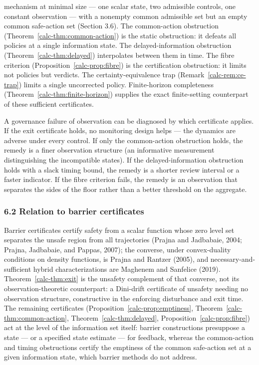 \documentclass[10pt,twocolumn]{article}
\theoremstyle{definition}
\begin{document}
mechanism at minimal size --- one scalar state, two admissible controls,
one constant observation --- with a nonempty common admissible set but an empty common safe-action set (Section 3.6). The common-action obstruction (Theorem~\ref{calc-thm:common-action}) is the static
obstruction: it defeats all policies at a single information state. The
delayed-information obstruction (Theorem~\ref{calc-thm:delayed}) interpolates between them in
time. The fibre criterion (Proposition~\ref{calc-prop:fibre}) is the certification obstruction:
it limits not policies but verdicts. The certainty-equivalence trap
(Remark~\ref{calc-rem:ce-trap}) limits a single uncorrected policy. Finite-horizon completeness
(Theorem~\ref{calc-thm:finite-horizon}) supplies the exact finite-setting
counterpart of these sufficient certificates.

A governance failure of observation can be diagnosed by which
certificate applies. If the exit certificate holds, no monitoring design
helps --- the dynamics are adverse under every control. If only the
common-action obstruction holds, the remedy is a finer observation
structure (an informative measurement distinguishing the incompatible
states). If the delayed-information obstruction holds with a slack
timing bound, the remedy is a shorter review interval or a faster
indicator. If the fibre criterion fails, the remedy is an observation
that separates the sides of the floor rather than a better threshold on
the aggregate.

\subsubsection{6.2 Relation to barrier
certificates}\label{calc-relation-to-barrier-certificates}

Barrier certificates certify safety from a scalar function whose zero level set separates the unsafe region from all trajectories (Prajna and Jadbabaie, 2004; Prajna, Jadbabaie, and Pappas, 2007); the converse, under convex-duality conditions on density functions, is Prajna and Rantzer (2005), and necessary-and-sufficient hybrid characterizations are Maghenem and Sanfelice (2019). Theorem~\ref{calc-thm:exit} is the unsafety complement of that converse, not its observation-theoretic counterpart: a Dini-drift certificate of unsafety needing no observation structure, constructive in the enforcing disturbance and exit time. The remaining certificates (Proposition~\ref{calc-prop:emptiness}, Theorem~\ref{calc-thm:common-action}, Theorem~\ref{calc-thm:delayed}, Proposition~\ref{calc-prop:fibre}) act at the level of the information set itself: barrier constructions presuppose a state --- or a specified state estimate --- for feedback, whereas the common-action and timing obstructions certify the emptiness of the common safe-action set at a given information state, which barrier methods do not address.
\end{document}
